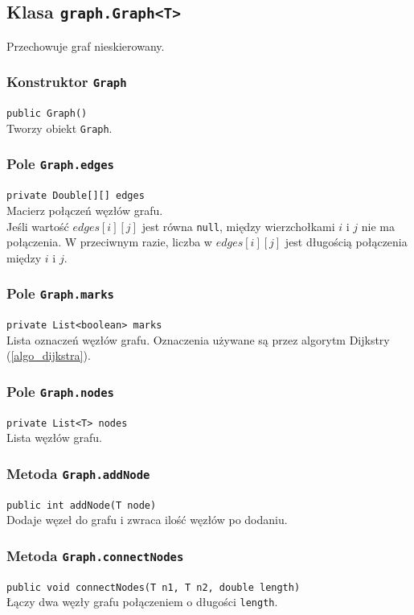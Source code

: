 \documentclass{article}
\begin{document}
\pagebreak
\subsection{Klasa \texttt{graph.Graph<T>}}
Przechowuje graf nieskierowany.

\subsubsection{Konstruktor \texttt{Graph}}
\texttt{public Graph()} \\
Tworzy obiekt \texttt{Graph}.

\subsubsection{Pole \texttt{Graph.edges}}
\texttt{private Double[][] edges} \\
Macierz połączeń węzłów grafu. \\
Jeśli wartość \(edges[i][j]\) jest równa \texttt{null}, między wierzchołkami \(i\) i \(j\) nie ma połączenia. W przeciwnym razie, liczba w \(edges[i][j]\) jest długością połączenia między \(i\) i \(j\).

\subsubsection{Pole \texttt{Graph.marks}}
\texttt{private List<boolean> marks} \\
Lista oznaczeń węzłów grafu. Oznaczenia używane są przez algorytm Dijkstry (\ref{algo_dijkstra}).

\subsubsection{Pole \texttt{Graph.nodes}}
\texttt{private List<T> nodes} \\
Lista węzłów grafu.

\subsubsection{Metoda \texttt{Graph.addNode}}
\texttt{public int addNode(T node)} \\
Dodaje węzeł do grafu i zwraca ilość węzłów po dodaniu.

\subsubsection{Metoda \texttt{Graph.connectNodes}}
\texttt{public void connectNodes(T n1, T n2, double length)} \\
Łączy dwa węzły grafu połączeniem o długości \texttt{length}.
\end{document}
